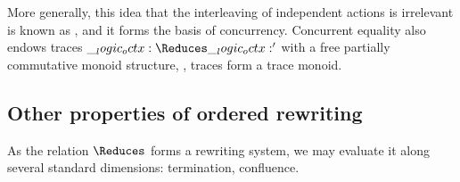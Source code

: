 More generally, this idea that the interleaving of independent actions is irrelevant is known as \autocite{Watkins+:CMU02}, and it forms the basis of concurrency.\autocite{??}
Concurrent equality also endows traces $\octx \Reduces \octx'$ with a free partially commutative monoid structure, \ie, traces form a trace monoid.







\subsection{Other properties of ordered rewriting}

As the relation $\Reduces$ forms a rewriting system, we may evaluate it along several standard dimensions: termination, confluence.



